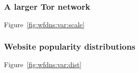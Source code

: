 \subsubsection{A larger Tor network}
Figure~\ref{fig:wfdns:var:scale}

\subsubsection{Website popularity distributions}
Figure~\ref{fig:wfdns:var:dist}



